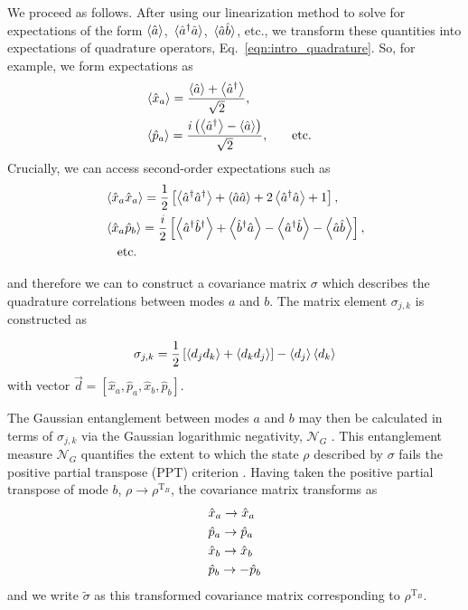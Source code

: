 We proceed as follows. After using our linearization method to solve for expectations of the form $\ev{\hat{a}}$, $\ev*{\hat{a}^\dagger \hat{a}}$, $\ev*{\hat{a}\hat{b}}$, etc., we transform these quantities into expectations of quadrature operators, Eq.~\ref{eqn:intro_quadrature}. So, for example, we form expectations as 
\begin{align}
&\ev{\hat{x}_a} = \frac{\ev{\hat{a}} + \ev{\hat{a}^\dagger}}{\sqrt{2}}, \notag \\
%
&\ev{\hat{p}_a} = \frac{i \left(\ev{\hat{a}^\dagger} - \ev{\hat{a}}\right)}{\sqrt{2}}, &\qq{etc.}\notag 
\end{align}
Crucially, we can access second-order expectations such as
\begin{align}
&\ev{\hat{x}_a \hat{x}_a} = \frac{1}{2}\left[\ev{\hat{a}^\dagger \hat{a}^\dagger} + \ev{\hat{a} \hat{a}} + 2 \ev{\hat{a}^\dagger \hat{a}} + 1\right], \notag \\
%
&\ev{\hat{x}_a \hat{p}_b} = \frac{i}{2}\left[\ev{\hat{a}^\dagger \hat{b}^\dagger} + \ev{\hat{b}^\dagger \hat{a}} - \ev{\hat{a}^\dagger \hat{b}} - \ev{\hat{a} \hat{b}} \right], \notag \\
%
&\qq{etc.} \notag
\end{align}

\noindent and therefore we can to construct a covariance matrix $\sigma$ \cite{Weedbrook2012} which describes the quadrature correlations between modes $a$ and $b$. The matrix element $\sigma_{j, k}$ is constructed as %

\begin{equation}\label{eqn:covariance matrix}
\sigma_{j, k} = \frac{1}{2} \left[ \ev{d_j d_k} + \ev{d_k d_j}\right] - \ev{d_j} \ev{d_k}
\end{equation}
with vector $\overrightarrow{d} = \left[\hat{x}_a, \hat{p}_a, \hat{x}_b, \hat{p}_b \right]$.

The Gaussian entanglement between modes $a$ and $b$ may then be calculated in terms of $\sigma_{j, k}$ via the Gaussian logarithmic negativity, $\mathcal{N}_G$ \cite{Adesso2007, Simon2000}. This entanglement measure $\mathcal{N}_G$ quantifies the extent to which the state $\rho$ described by $\sigma$ fails the positive partial transpose (PPT) criterion \cite{Simon2000, Plenio2005}. Having taken the positive partial transpose of mode $b$, $\rho \rightarrow \rho^{\text{T}_B}$, the covariance matrix transforms as
\begin{align}
&\hat{x}_a \rightarrow \hat{x}_a \notag \\
%
&\hat{p}_a \rightarrow \hat{p}_a \notag \\
%
&\hat{x}_b \rightarrow \hat{x}_b \notag \\
%
&\hat{p}_b \rightarrow - \hat{p}_b \notag
\end{align}
and we write $\tilde{\sigma}$ as this transformed covariance matrix corresponding to $\rho^{\text{T}_B}$.

